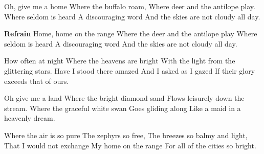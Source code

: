 \footnotemark [
ititle={Home on the range}]

\beginverse
Oh, give me a home
Where the buffalo roam,
Where deer and the antilope play.
Where seldom is heard
A discouraging word
And the skies are not cloudy all day.
\endverse

\beginchorus
\textbf{Refrain}
Home, home on the range
Where the deer and the antilope play
Where seldom is heard
A discouraging word
And the skies are not cloudy all day.
\endchorus

\beginverse
How often at night
Where the heavens are bright
With the light from the glittering stars.
Have I stood there amazed
And I asked as I gazed
If their glory exceeds that of ours.
\endverse

\beginverse
Oh give me a land
Where the bright diamond sand
Flows leisurely down the stream.
Where the graceful white swan
Goes gliding along
Like a maid in a heavenly dream.
\endverse

\beginverse
Where the air is so pure
The zephyrs so free,
The breezes so balmy and light,
That I would not exchange
My home on the range
For all of the cities so bright.
\endverse
\endsong